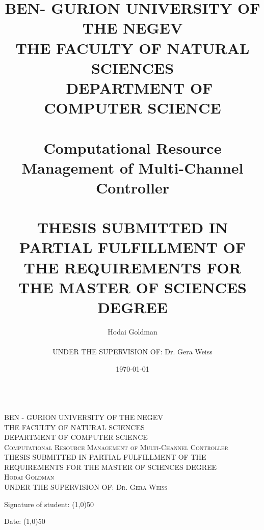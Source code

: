 \documentclass[ twoside, 12pt ]{article}
\title{\vspace{2cm}\LARGE BEN- GURION UNIVERSITY OF THE NEGEV \\
    \Large THE FACULTY OF NATURAL SCIENCES \\ ~
    \large DEPARTMENT OF COMPUTER SCIENCE \\ ~ \\ \vspace{1cm}Computational Resource Management of Multi-Channel Controller \\ ~ \\ \vspace{1cm}
    \normalsize THESIS SUBMITTED IN PARTIAL FULFILLMENT OF THE REQUIREMENTS FOR 
    THE MASTER OF SCIENCES DEGREE 
}
\author{\Large Hodai Goldman \\ ~ \\ \vspace{1cm}
    UNDER THE SUPERVISION OF: Dr. Gera Weiss }
\date{\printdayoff\today}
\begin{document}
\begin{titlepage}
\maketitle
\end{titlepage}

\begin{titlepage}
    \hspace{3cm}
\end{titlepage}


\begin{titlepage}
    
    \begin{center} 
        \hspace{3cm}\\[2cm]
        \textsc{\large BEN - GURION UNIVERSITY OF THE NEGEV}\\[0.3cm]
        \textsc{\large THE FACULTY OF NATURAL SCIENCES }\\
        \textsc{\large DEPARTMENT OF COMPUTER SCIENCE}\\[1cm]
        
        
        \textsc{\large Computational Resource Management of Multi-Channel Controller }\\[1.5cm]
        
        
        \textsc{THESIS SUBMITTED IN PARTIAL FULFILLMENT OF THE REQUIREMENTS FOR 
            THE MASTER OF SCIENCES DEGREE }\\[1.5cm]
        
        
        \textsc{\large Hodai Goldman}\\
        \textsc{\large UNDER THE SUPERVISION OF: Dr. Gera Weiss }
        
        
        
        \vspace{4cm}
        
        
        \begin{minipage}{0.8\textwidth}
            \begin{flushleft}
                Signature of student: \line(1,0){50}
            \end{flushleft}
        \end{minipage}
        \begin{minipage}{0.19\textwidth}
            \begin{flushright}
                Date: \line(1,0){50}
            \end{flushright}
        \end{minipage}
        

\end{center}
\end{titlepage}
\end{document}
